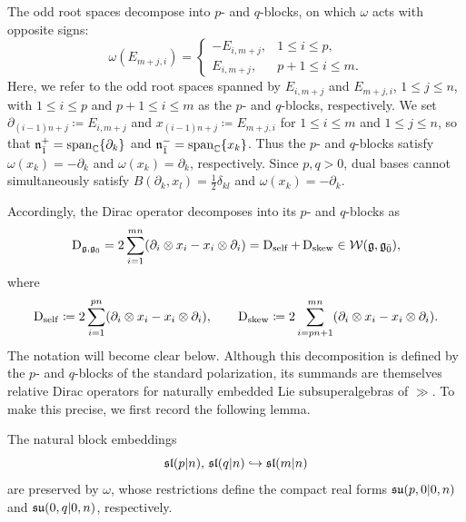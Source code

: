 The odd
root spaces decompose into $p$- and $q$-blocks, on which $\omega$ acts
with opposite signs:
\begin{equation}
 \omega(E_{m+j,i})
 =
 \begin{cases}
 -E_{i,m+j}, & 1\leq i\leq p,\\
 E_{i,m+j}, & p+1\leq i\leq m.
 \end{cases}
\end{equation}
Here, we refer to the odd root spaces spanned by $E_{i,m+j}$ and $E_{m+j,i}$, $1\leq j\leq n$, with $1\leq i\leq p$ and $p+1\leq i\leq m$ as the $p$- and $q$-blocks, respectively. We set $\partial_{(i-1)n+j}\coloneqq E_{i,m+j}$ and
$x_{(i-1)n+j}\coloneqq E_{m+j,i}$ for $1\leq i\leq m$ and
$1\leq j\leq n$, so that
$\nn_{\bar1}^{+}=\operatorname{span}_{\CC}\{\partial_k\}$ and
$\nn_{\bar1}^{-}=\operatorname{span}_{\CC}\{x_k\}$. Thus the $p$- and
$q$-blocks satisfy $\omega(x_k)=-\partial_k$ and
$\omega(x_k)=\partial_k$, respectively. Since $p,q>0$, dual bases
cannot simultaneously satisfy
$B(\partial_k,x_l)=\tfrac12\delta_{kl}$ and
$\omega(x_k)=-\partial_k$.

Accordingly, the Dirac operator decomposes into its $p$- and $q$-blocks as
\begin{equation}
 \Dirac_{\gg,\even}
 =
 2\sum_{i=1}^{mn}
 (\partial_i\otimes x_i-x_i\otimes\partial_i)
 =
 \Dirac_{\mathrm{self}}+\Dirac_{\mathrm{skew}}
 \in\mathcal{W}(\gg,\even),
\end{equation}
where
\begin{equation}\label{eq:Dself_Dskew}
 \Dirac_{\mathrm{self}}
 \coloneqq
 2\sum_{i=1}^{pn}
 (\partial_i\otimes x_i-x_i\otimes\partial_i),
 \qquad
 \Dirac_{\mathrm{skew}}
 \coloneqq
 2\sum_{i=pn+1}^{mn}
 (\partial_i\otimes x_i-x_i\otimes\partial_i).
\end{equation}
The notation will become clear below. Although this decomposition is
defined by the $p$- and $q$-blocks of the standard polarization, its
summands are themselves relative Dirac operators for naturally embedded
Lie subsuperalgebras of $\gg$. To make this precise, we first record the
following lemma.

\begin{lemma}
The natural block embeddings
\begin{equation*}
 \sl(p\vert n),\,\sl(q\vert n)\hookrightarrow\sl(m\vert n)
\end{equation*}
are preserved by $\omega$, whose restrictions define the compact real
forms $\su(p,0\vert0,n)$ and $\su(0,q\vert0,n)$, respectively.
\end{lemma}

